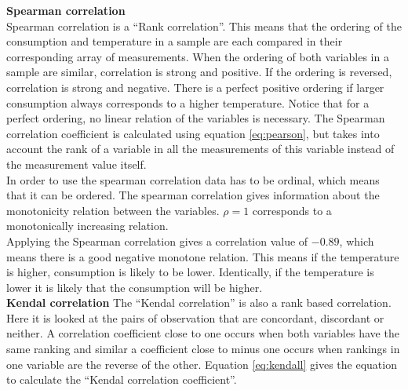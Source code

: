 \textbf{Spearman correlation}\\
Spearman correlation is a ``Rank correlation''. This means that the ordering of the consumption and temperature in a sample are each compared in their corresponding array of measurements.  When the ordering of both variables in a sample are similar, correlation is strong and positive. If the ordering is reversed, correlation is strong and negative. There is a perfect positive ordering if larger consumption always corresponds to a higher temperature. Notice that for a perfect ordering, no linear relation of the variables is necessary. The Spearman correlation coefficient is calculated using equation \ref{eq:pearson}, but takes into account the rank of a variable in all the measurements of this variable instead of the measurement value itself.\\

In order to use the spearman correlation data has to be ordinal, which means that it can be ordered. The spearman correlation gives information about the monotonicity relation between the variables. $ \rho = 1 $ corresponds to a monotonically increasing relation.\\

Applying the Spearman correlation  gives a correlation value of $ -0.89$, which means there is a good negative monotone relation. This means if the temperature is higher, consumption is likely to be lower. Identically, if the temperature is lower it is likely that the consumption will be higher. \\

\textbf{Kendal correlation}
The ``Kendal correlation'' is also a rank based correlation. Here it is looked at the pairs of observation that are concordant, discordant or neither. A correlation coefficient close to one occurs when both variables have the same ranking and similar a coefficient close to minus one occurs when rankings in one variable are the reverse of the other. Equation \ref{eq:kendall} gives the equation to calculate the ``Kendal correlation coefficient''.

